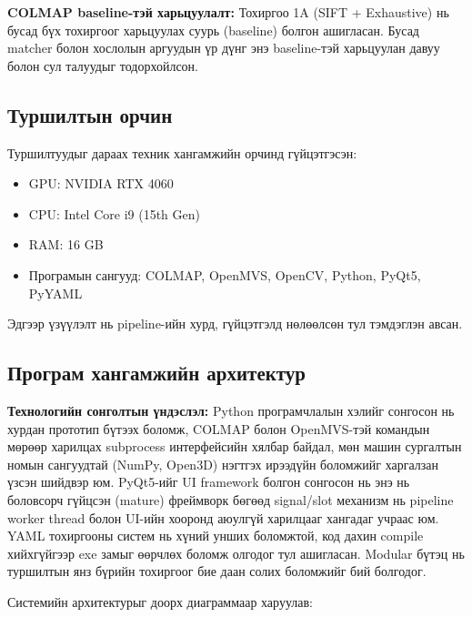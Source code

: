\textbf{COLMAP baseline-тэй харьцуулалт:} Тохиргоо 1A (SIFT + Exhaustive) нь бусад бүх тохиргоог харьцуулах суурь (baseline) болгон ашигласан. Бусад matcher болон хослолын аргуудын үр дүнг энэ baseline-тэй харьцуулан давуу болон сул талуудыг тодорхойлсон.

\subsection{Туршилтын орчин}
Туршилтуудыг дараах техник хангамжийн орчинд гүйцэтгэсэн:
\begin{itemize}
    \item GPU: NVIDIA RTX 4060
    \item CPU: Intel Core i9 (15th Gen)
    \item RAM: 16 GB
    \item Програмын сангууд: COLMAP, OpenMVS, OpenCV, Python, PyQt5, PyYAML
\end{itemize}
Эдгээр үзүүлэлт нь pipeline-ийн хурд, гүйцэтгэлд нөлөөлсөн тул тэмдэглэн авсан.

\clearpage

\subsection{Програм хангамжийн архитектур}

\textbf{Технологийн сонголтын үндэслэл:} Python програмчлалын хэлийг сонгосон нь хурдан прототип бүтээх боломж, COLMAP болон OpenMVS-тэй командын мөрөөр харилцах subprocess интерфейсийн хялбар байдал, мөн машин сургалтын номын сангуудтай (NumPy, Open3D) нэгтгэх ирээдүйн боломжийг харгалзан үзсэн шийдвэр юм. PyQt5-ийг UI framework болгон сонгосон нь энэ нь боловсорч гүйцсэн (mature) фреймворк бөгөөд signal/slot механизм нь pipeline worker thread болон UI-ийн хооронд аюулгүй харилцааг хангадаг учраас юм. YAML тохиргооны систем нь хүний унших боломжтой, код дахин compile хийхгүйгээр exe замыг өөрчлөх боломж олгодог тул ашигласан. Modular бүтэц нь туршилтын янз бүрийн тохиргоог бие даан солих боломжийг бий болгодог.

Системийн архитектурыг доорх диаграммаар харуулав:

